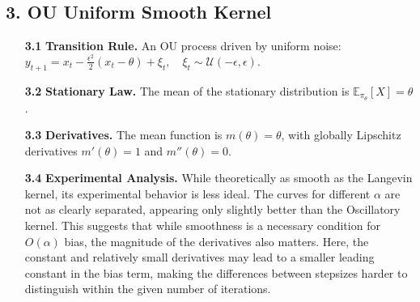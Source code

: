 \documentclass[a4paper]{article}
\begin{document}
\subsection*{3. OU Uniform Smooth Kernel}
\begin{itemize}
	\item[\bfseries 3.1] \textbf{Transition Rule.} An OU process driven by uniform noise: \( y_{t+1} = x_t - \tfrac{\epsilon^2}{2}(x_t-\theta) + \xi_t, \quad \xi_t \sim \mathcal{U}(-\epsilon, \epsilon). \)
	\item[\bfseries 3.2] \textbf{Stationary Law.} The mean of the stationary distribution is \(\mathbb{E}_{\pi_\theta}[X] = \theta\).
	\item[\bfseries 3.3] \textbf{Derivatives.} The mean function is \(m(\theta)=\theta\), with globally Lipschitz derivatives \(m'(\theta)=1\) and \(m''(\theta)=0\).
	\item[\bfseries 3.4] \textbf{Experimental Analysis.} While theoretically as smooth as the Langevin kernel, its experimental behavior is less ideal. The curves for different \(\alpha\) are not as clearly separated, appearing only slightly better than the Oscillatory kernel. This suggests that while smoothness is a necessary condition for \(O(\alpha)\) bias, the magnitude of the derivatives also matters. Here, the constant and relatively small derivatives may lead to a smaller leading constant in the bias term, making the differences between stepsizes harder to distinguish within the given number of iterations.
\end{itemize}
\end{document}
